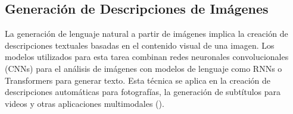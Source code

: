\subsection{Generación de Descripciones de Imágenes}
La generación de lenguaje natural a partir de imágenes implica la creación de descripciones textuales basadas en el contenido visual de una imagen. Los modelos utilizados para esta tarea combinan redes neuronales convolucionales (CNNs) para el análisis de imágenes con modelos de lenguaje como RNNs o Transformers para generar texto. Esta técnica se aplica en la creación de descripciones automáticas para fotografías, la generación de subtítulos para videos y otras aplicaciones multimodales (\cite{vinyals2015show}).

